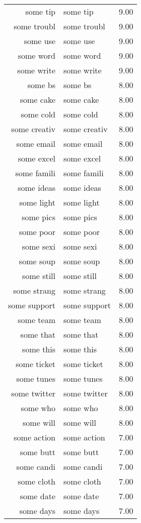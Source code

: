 \begin{table}[ht]
\begin{tabular}{rlr}
  some tip & some tip & 9.00 \\ 
  some troubl & some troubl & 9.00 \\ 
  some use & some use & 9.00 \\ 
  some word & some word & 9.00 \\ 
  some write & some write & 9.00 \\ 
  some bs & some bs & 8.00 \\ 
  some cake & some cake & 8.00 \\ 
  some cold & some cold & 8.00 \\ 
  some creativ & some creativ & 8.00 \\ 
  some email & some email & 8.00 \\ 
  some excel & some excel & 8.00 \\ 
  some famili & some famili & 8.00 \\ 
  some ideas & some ideas & 8.00 \\ 
  some light & some light & 8.00 \\ 
  some pics & some pics & 8.00 \\ 
  some poor & some poor & 8.00 \\ 
  some sexi & some sexi & 8.00 \\ 
  some soup & some soup & 8.00 \\ 
  some still & some still & 8.00 \\ 
  some strang & some strang & 8.00 \\ 
  some support & some support & 8.00 \\ 
  some team & some team & 8.00 \\ 
  some that & some that & 8.00 \\ 
  some this & some this & 8.00 \\ 
  some ticket & some ticket & 8.00 \\ 
  some tunes & some tunes & 8.00 \\ 
  some twitter & some twitter & 8.00 \\ 
  some who & some who & 8.00 \\ 
  some will & some will & 8.00 \\ 
  some action & some action & 7.00 \\ 
  some butt & some butt & 7.00 \\ 
  some candi & some candi & 7.00 \\ 
  some cloth & some cloth & 7.00 \\ 
  some date & some date & 7.00 \\ 
  some days & some days & 7.00 \\ 

\end{tabular}
\end{table}
